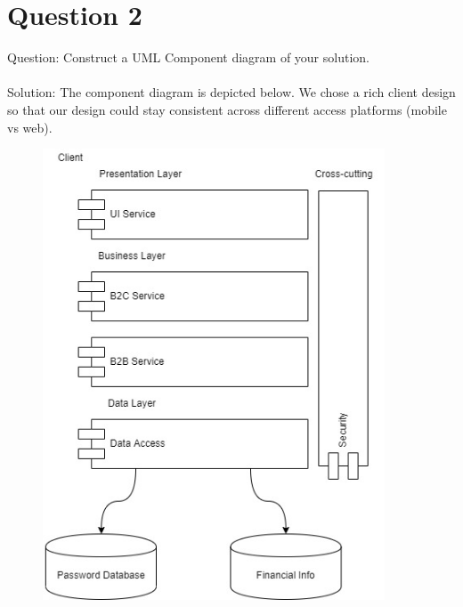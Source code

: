 \documentclass{article}
\begin{document}
\section*{Question 2} 
Question: Construct a UML Component diagram of your solution. \\\\
Solution: The component diagram is depicted below. We chose a rich client design so that our design could stay consistent across different access platforms (mobile vs web). \\
\begin{figure}[h]
	\includegraphics[width=4in]{Component.jpg}
\end{figure}

\newpage
\end{document}
